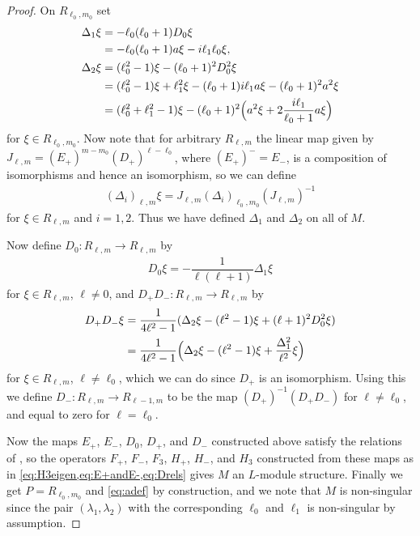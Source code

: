 \begin{proof}
  On $R_{\ell_0,m_0}$ set 
  \begin{align}
    \begin{aligned}\label{eq:DeltasRell0m0}
      \Delta_1 \xi &= -\ell_0(\ell_0+1)D_0\xi \\
      &= -\ell_0(\ell_0+1)a\xi - i\ell_1\ell_0\xi, \\
      \Delta_2 \xi &= (\ell_0^2-1)\xi - (\ell_0+1)^2D_0^2\xi \\
      &= (\ell_0^2-1)\xi + \ell_1^2\xi - (\ell_0+1)i\ell_1a\xi - (\ell_0+1)^2a^2\xi \\
      &= (\ell_0^2+\ell_1^2-1)\xi - (\ell_0+1)^2\Bigl( a^2\xi + 2\dfrac{i\ell_1}{\ell_0+1}a\xi \Bigr)
    \end{aligned}
  \end{align}
  for $\xi \in R_{\ell_0,m_0}$. Now note that for arbitrary $R_{\ell,m}$ the linear map given by $J_{\ell,m}=(E_+)^{m-m_0}(D_+)^{\ell-\ell_0}$, where $(E_+)^- = E_-$, is a composition of isomorphisms and hence an isomorphism, so we can define 
  \begin{align*}
    (\Delta_i)_{\ell,m}\xi = J_{\ell,m}(\Delta_i)_{\ell_0,m_0} (J_{\ell,m})^{-1}
  \end{align*}
  for $\xi\in R_{\ell,m}$ and $i=1,2$. Thus we have defined $\Delta_1$ and $\Delta_2$ on all of $M$.
  
  Now define $D_0\colon R_{\ell,m}\to R_{\ell,m}$ by 
  \begin{align}\label{eq:D0fromDelta1}
    D_0\xi = -\dfrac{1}{\ell(\ell+1)}\Delta_1 \xi
  \end{align}
  for $\xi\in R_{\ell,m}$, $\ell\neq 0$, and $D_+D_-\colon R_{\ell,m}\to R_{\ell,m}$ by 
  \begin{align}
    \begin{aligned}\label{eq:D+D-fromDeltas}
      D_+D_-\xi &= \dfrac{1}{4\ell^2-1}(\Delta_2\xi - (\ell^2-1)\xi + (\ell+1)^2D_0^2\xi) \\
      &= \dfrac{1}{4\ell^2-1}\Bigl(\Delta_2\xi - (\ell^2-1)\xi + \dfrac{\Delta_1^2}{\ell^2}\xi\Bigr)
    \end{aligned}
  \end{align}
  for $\xi \in R_{\ell,m}$, $\ell\neq \ell_0$, which we can do since $D_+$ is an isomorphism. Using this we define $D_-\colon R_{\ell,m}\to R_{\ell-1,m}$ to be the map $(D_+)^{-1}(D_+D_-)$ for $\ell\neq \ell_0$, and equal to zero for $\ell=\ell_0$. 

  Now the maps $E_+$, $E_-$, $D_0$, $D_+$, and $D_-$ constructed above satisfy the relations of ,  so the operators $F_+$, $F_-$, $F_3$, $H_+$, $H_-$, and $H_3$ constructed from these maps as in \cref{eq:H3eigen,eq:E+andE-,eq:Drels} gives $M$ an $L$-module structure. Finally we get $P=R_{\ell_0,m_0}$ and \cref{eq:adef} by construction, and we note that $M$ is non-singular since the pair $(\lambda_1,\lambda_2)$ with the corresponding $\ell_0$ and $\ell_1$ is non-singular by assumption.
\end{proof}

